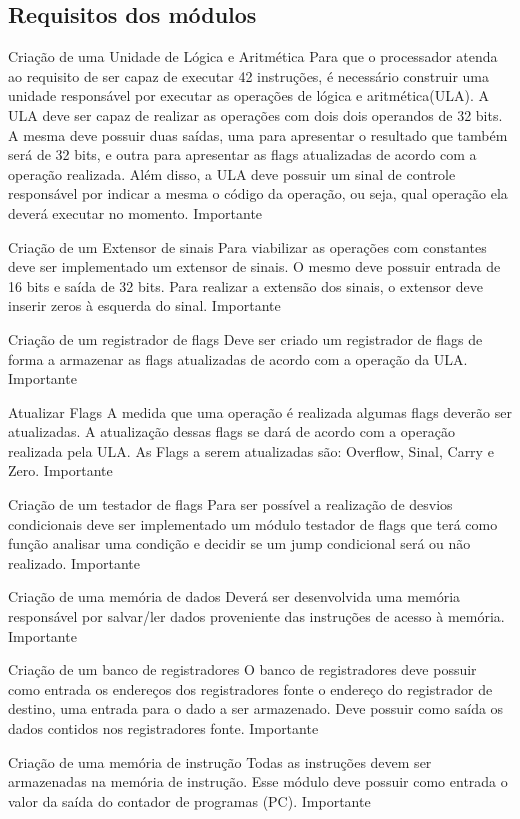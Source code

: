 \documentclass{report}
\begin{document}
    \subsection{Requisitos dos módulos}
    \begin{functional}
      \requirement
      {Criação de uma Unidade de Lógica e Aritmética}
      {Para que o processador atenda ao requisito de ser capaz de executar 42 instruções, é necessário construir uma unidade responsável por executar as operações de lógica e aritmética(ULA). A ULA deve ser capaz de realizar as operações com dois dois operandos de 32 bits. A mesma deve possuir duas saídas, uma para apresentar o resultado que também será de 32 bits, e outra para apresentar as flags atualizadas de acordo com a operação realizada. Além disso, a ULA deve possuir um sinal de controle responsável por indicar a mesma o código da operação, ou seja, qual operação ela deverá executar no momento.}
      {Importante}
      
       \requirement
      {Criação de um Extensor de sinais}
      {Para viabilizar as operações com constantes deve ser implementado um extensor de sinais. O mesmo deve possuir entrada de 16 bits e saída de 32 bits. Para realizar a extensão dos sinais, o extensor deve inserir zeros à esquerda do sinal.}
      {Importante}
      
       \requirement
      {Criação de um registrador de flags}
      {Deve ser criado um registrador de flags de forma a armazenar as flags atualizadas de acordo com a operação da ULA.}
      {Importante}
      
    \requirement
      {Atualizar Flags}
      {A medida que uma operação é realizada algumas flags deverão ser atualizadas. A atualização dessas flags se dará de acordo com a operação realizada pela ULA. As Flags a serem atualizadas são: Overflow, Sinal, Carry e Zero.}
      {Importante}
   
      \requirement
      {Criação de um testador de flags}
      {Para ser possível a realização de desvios condicionais deve ser implementado um módulo testador de flags que terá como função analisar uma condição e decidir se um jump condicional será ou não realizado.}
      {Importante}
      
       \requirement
      {Criação de uma memória de dados}
      {Deverá ser desenvolvida uma memória responsável por salvar/ler dados proveniente das instruções de acesso à memória.}
      {Importante}
      
       \requirement
      {Criação de um banco de registradores}
      {O banco de registradores deve possuir como entrada os endereços dos registradores fonte o endereço do registrador de destino, uma entrada para o dado a ser armazenado. Deve possuir como saída os dados contidos nos registradores fonte.}
      {Importante}
      
       \requirement
      {Criação de uma memória de instrução}
      {Todas as instruções devem ser armazenadas na memória de instrução. Esse módulo deve possuir como entrada o valor da saída do contador de programas (PC).}
      {Importante}
    
      \end{functional}
      
\end{document}
